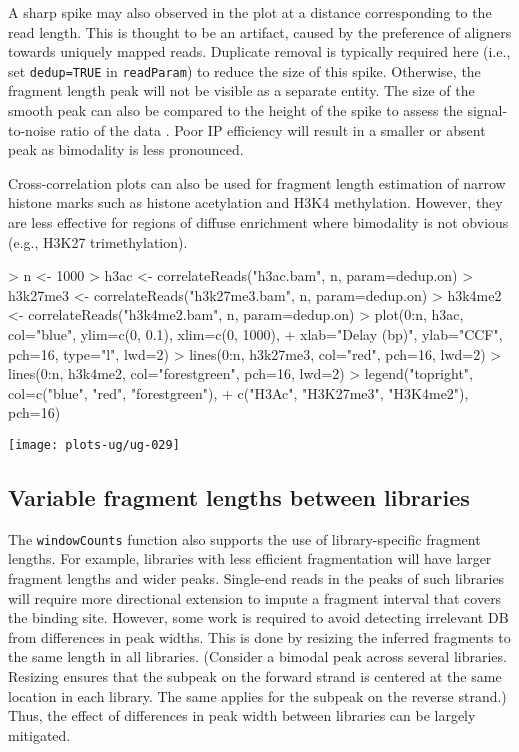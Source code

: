 \documentclass[12pt]{report}
\renewenvironment{Schunk}{\vspace{0pt}}{\vspace{0pt}}
\newcommand{\code}[1]{{\small\texttt{#1}}}
\begin{document}
A sharp spike may also observed in the plot at a distance corresponding to the read length. 
This is thought to be an artifact, caused by the preference of aligners towards uniquely mapped reads. 
Duplicate removal is typically required here (i.e., set \code{dedup=TRUE} in \code{readParam}) to reduce the size of this spike. 
Otherwise, the fragment length peak will not be visible as a separate entity.
The size of the smooth peak can also be compared to the height of the spike to assess the signal-to-noise ratio of the data \citep{landt2012}. 
Poor IP efficiency will result in a smaller or absent peak as bimodality is less pronounced. 

Cross-correlation plots can also be used for fragment length estimation of narrow histone marks such as histone acetylation and H3K4 methylation.
However, they are less effective for regions of diffuse enrichment where bimodality is not obvious (e.g., H3K27 trimethylation).

\begin{Schunk}
\begin{Sinput}
> n <- 1000
> h3ac <- correlateReads("h3ac.bam", n, param=dedup.on)
> h3k27me3 <- correlateReads("h3k27me3.bam", n, param=dedup.on)
> h3k4me2 <- correlateReads("h3k4me2.bam", n, param=dedup.on)
> plot(0:n, h3ac, col="blue", ylim=c(0, 0.1), xlim=c(0, 1000),
+     xlab="Delay (bp)", ylab="CCF", pch=16, type="l", lwd=2)
> lines(0:n, h3k27me3, col="red", pch=16, lwd=2)
> lines(0:n, h3k4me2, col="forestgreen", pch=16, lwd=2)
> legend("topright", col=c("blue", "red", "forestgreen"),
+     c("H3Ac", "H3K27me3", "H3K4me2"), pch=16)
\end{Sinput}
\end{Schunk}
\label{data:ccf}

\begin{center}
\texttt{[image: plots-ug/ug-029]}
\end{center}

\subsection{Variable fragment lengths between libraries}
\label{sec:coercelen}

The \code{windowCounts} function also supports the use of library-specific fragment lengths.
For example, libraries with less efficient fragmentation will have larger fragment lengths and wider peaks.
Single-end reads in the peaks of such libraries will require more directional extension to impute a fragment interval that covers the binding site.
However, some work is required to avoid detecting irrelevant DB from differences in peak widths.
This is done by resizing the inferred fragments to the same length in all libraries.
(Consider a bimodal peak across several libraries.
Resizing ensures that the subpeak on the forward strand is centered at the same location in each library.
The same applies for the subpeak on the reverse strand.)
Thus, the effect of differences in peak width between libraries can be largely mitigated.
\end{document}
